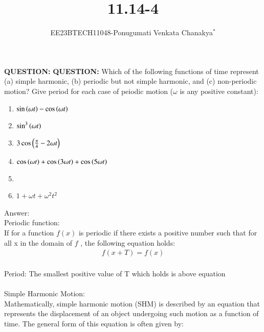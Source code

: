\documentclass[journal,12pt,twocolumn]{IEEEtran}
\theoremstyle{remark}
\begin{document}
 
 \vspace{3cm}
 \title{\textbf{11.14-4}}
 \author{EE23BTECH11048-Ponugumati Venkata Chanakya$^{*}$%
 }
 \maketitle
 \newpage
 \bigskip
 \renewcommand{\thefigure}{\theenumi}
 \renewcommand{\thetable}{\theenumi}
 \textbf{QUESTION:}
 \textbf{QUESTION:}
 Which of the following functions of time represent (a) simple harmonic, (b) periodic
 but not simple harmonic, and (c) non-periodic motion? Give period for each case of
 peiodic motion ($\omega$ is any positive constant):\\
 \begin{enumerate}
 \item $\sin\left(\omega t\right)-\cos\left(\omega t\right)$\\
 \item $\sin^3\left(\omega t\right)$\\
 \item $3\cos\left(\frac{\pi}{4}- 2\omega t\right)$\\
 \item $\cos\left(\omega t\right)+\cos\left(3\omega t\right)+\cos\left(5\omega t\right)$\\
 \item {}\\
 \item $1+\omega t+\omega^2 t^2$\\
  \end{enumerate}
 Answer:\\
   Periodic function:\\ 
   If for a function $f(x)$ is periodic  if there exists a positive number  such that for all x in the domain of $f$ , the following equation holds:\\
   \begin{align}
   f(x+T)=f(x)
   \end{align}
   \\
   Period: The smallest positive value of T which holds is above equation\\
   \\
   Simple Harmonic Motion:\\
   Mathematically, simple harmonic motion (SHM) is described by an equation that represents the displacement of an object undergoing such motion as a function of time. The general form of this equation is often given by:\\
\end{document}

